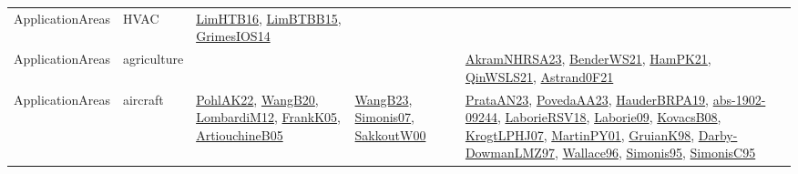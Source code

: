 {\begin{longtable}{lp{3cm}>{\raggedright}p{6cm}>{\raggedright}p{6cm}p{8cm}}
ApplicationAreas & HVAC & \href{papers/LimHTB16.pdf}{LimHTB16}\cite{LimHTB16}, \href{papers/LimBTBB15.pdf}{LimBTBB15}\cite{LimBTBB15}, \href{articles/GrimesIOS14.pdf}{GrimesIOS14}\cite{GrimesIOS14} &  & \\
ApplicationAreas & agriculture &  &  & \href{articles/AkramNHRSA23.pdf}{AkramNHRSA23}\cite{AkramNHRSA23}, \href{papers/BenderWS21.pdf}{BenderWS21}\cite{BenderWS21}, \href{articles/HamPK21.pdf}{HamPK21}\cite{HamPK21}, \href{articles/QinWSLS21.pdf}{QinWSLS21}\cite{QinWSLS21}, \href{papers/Astrand0F21.pdf}{Astrand0F21}\cite{Astrand0F21}\\
ApplicationAreas & aircraft & \href{articles/PohlAK22.pdf}{PohlAK22}\cite{PohlAK22}, \href{papers/WangB20.pdf}{WangB20}\cite{WangB20}, \href{articles/LombardiM12.pdf}{LombardiM12}\cite{LombardiM12}, \href{papers/FrankK05.pdf}{FrankK05}\cite{FrankK05}, \href{papers/ArtiouchineB05.pdf}{ArtiouchineB05}\cite{ArtiouchineB05} & \href{papers/WangB23.pdf}{WangB23}\cite{WangB23}, \href{articles/Simonis07.pdf}{Simonis07}\cite{Simonis07}, \href{articles/SakkoutW00.pdf}{SakkoutW00}\cite{SakkoutW00} & \href{articles/PrataAN23.pdf}{PrataAN23}\cite{PrataAN23}, \href{papers/PovedaAA23.pdf}{PovedaAA23}\cite{PovedaAA23}, \href{articles/HauderBRPA19.pdf}{HauderBRPA19}\cite{HauderBRPA19}, \href{articles/abs-1902-09244.pdf}{abs-1902-09244}\cite{abs-1902-09244}, \href{articles/LaborieRSV18.pdf}{LaborieRSV18}\cite{LaborieRSV18}, \href{papers/Laborie09.pdf}{Laborie09}\cite{Laborie09}, \href{articles/KovacsB08.pdf}{KovacsB08}\cite{KovacsB08}, \href{papers/KrogtLPHJ07.pdf}{KrogtLPHJ07}\cite{KrogtLPHJ07}, \href{articles/MartinPY01.pdf}{MartinPY01}\cite{MartinPY01}, \href{papers/GruianK98.pdf}{GruianK98}\cite{GruianK98}, \href{articles/Darby-DowmanLMZ97.pdf}{Darby-DowmanLMZ97}\cite{Darby-DowmanLMZ97}, \href{articles/Wallace96.pdf}{Wallace96}\cite{Wallace96}, \href{papers/Simonis95.pdf}{Simonis95}\cite{Simonis95}, \href{papers/SimonisC95.pdf}{SimonisC95}\cite{SimonisC95}\\

\end{longtable}}
